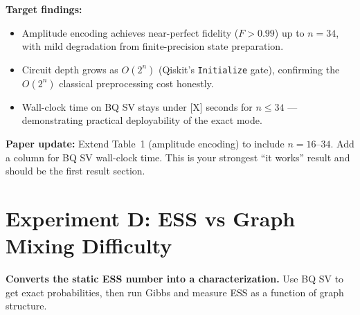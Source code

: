\documentclass[11pt]{article}
\begin{document}
\begin{notebox}
\textbf{Target findings:}
\begin{itemize}
  \item Amplitude encoding achieves near-perfect fidelity
        ($F > 0.99$) up to $n = 34$, with mild degradation from
        finite-precision state preparation.
  \item Circuit depth grows as $O(2^n)$ (Qiskit's
        \texttt{Initialize} gate), confirming the $O(2^n)$ classical
        preprocessing cost honestly.
  \item Wall-clock time on BQ SV stays under [X] seconds for
        $n \leq 34$ --- demonstrating practical deployability
        of the exact mode.
\end{itemize}
\textbf{Paper update:} Extend Table~1 (amplitude encoding) to include
$n = 16$--$34$. Add a column for BQ SV wall-clock time.
This is your strongest ``it works'' result and should be the
first result section.
\end{notebox}

\section{Experiment D: ESS vs Graph Mixing Difficulty}

\textbf{Converts the static ESS number into a characterization.}
Use BQ SV to get exact probabilities, then run Gibbs and measure
ESS as a function of graph structure.
\end{document}
